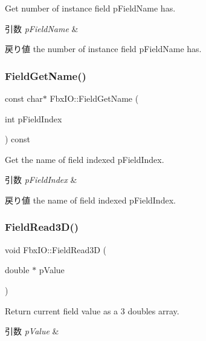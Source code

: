 Get number of instance field p\+Field\+Name has. 
\begin{DoxyParams}{引数}
{\em p\+Field\+Name} & \\
\hline
\end{DoxyParams}
\begin{DoxyReturn}{戻り値}
the number of instance field p\+Field\+Name has. 
\end{DoxyReturn}
\mbox{\label{class_fbx_i_o_afb555f3f58c25736a9f22925eb91f6d9}} 
\subsubsection{\texorpdfstring{Field\+Get\+Name()}{FieldGetName()}}
{\footnotesize\ttfamily const char$\ast$ Fbx\+I\+O\+::\+Field\+Get\+Name (\begin{DoxyParamCaption}\item[{int}]{p\+Field\+Index }\end{DoxyParamCaption}) const}

Get the name of field indexed p\+Field\+Index. 
\begin{DoxyParams}{引数}
{\em p\+Field\+Index} & \\
\hline
\end{DoxyParams}
\begin{DoxyReturn}{戻り値}
the name of field indexed p\+Field\+Index. 
\end{DoxyReturn}
\mbox{\label{class_fbx_i_o_a41258c146be085acabf73c83df05e34b}} 
\subsubsection{\texorpdfstring{Field\+Read3\+D()}{FieldRead3D()}\hspace{0.1cm}{\footnotesize\ttfamily [1/2]}}
{\footnotesize\ttfamily void Fbx\+I\+O\+::\+Field\+Read3D (\begin{DoxyParamCaption}\item[{double $\ast$}]{p\+Value }\end{DoxyParamCaption})}

Return current field value as a 3 doubles array. 
\begin{DoxyParams}{引数}
{\em p\+Value} & \\
\hline
\end{DoxyParams}
\mbox{\label{class_fbx_i_o_af10372aa1d3e251eba4e21800578d94f}} 
